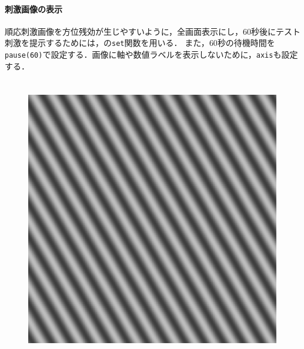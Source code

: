\paragraph{刺激画像の表示}
順応刺激画像を方位残効が生じやすいように，全画面表示にし，\(60\)秒後にテスト刺激を提示するためには，\matlab の\texttt{set}関数を用いる．
また，\(60\)秒の待機時間を\texttt{pause(60)}で設定する．画像に軸や数値ラベルを表示しないために，\texttt{axis}も設定する．
\section{\result}
\begin{figure}[h]
    \centering
    \begin{minipage}[b]{.19\textwidth}
        \centering
        \includegraphics[keepaspectratio,width=\textwidth]{../../Figures/07_10_l30.pdf}
    \end{minipage}
    \begin{minipage}[b]{.19\textwidth}
        \centering

\end{minipage}
\end{figure}
